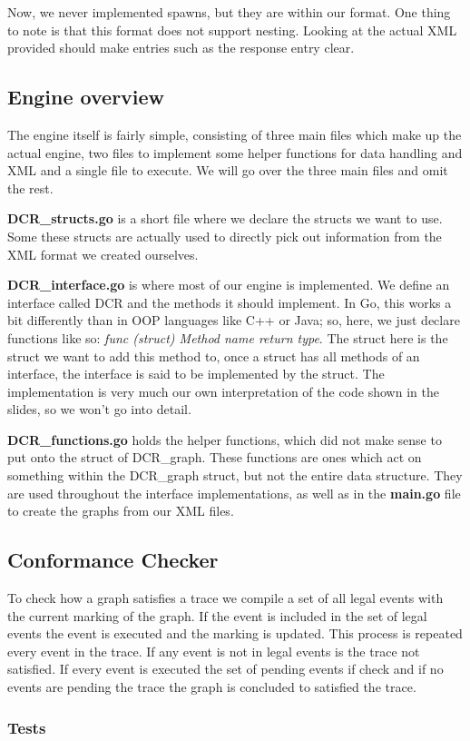 Now, we never implemented spawns, but they are within our format. One thing to note is that this
format does not support nesting. Looking at the actual XML provided should make entries such as the
response entry clear.

\subsection*{Engine overview}
The engine itself is fairly simple, consisting of three main files which make up the actual engine,
two files to implement some helper functions for data handling and XML and a single file to
execute. We will go over the three main files and omit the rest.

\textbf{DCR\_structs.go} is a short file where we declare the structs we want to use. Some these
structs are actually used to directly pick out information from the XML format we created
ourselves. 

\textbf{DCR\_interface.go} is where most of our engine is implemented. We define an interface
called DCR and the methods it should implement. In Go, this works a bit differently than in OOP
languages like C++ or Java; so, here, we just declare functions like so: \textit{func (struct)
Method name return type}. The struct here is the struct we want to add this method to, once
a struct has all methods of an interface, the interface is said to be implemented by the struct.
The implementation is very much our own interpretation of the code shown in the slides, so we won't
go into detail.

\textbf{DCR\_functions.go} holds the helper functions, which did not make sense to put onto the
struct of DCR\_graph. These functions are ones which act on something within the DCR\_graph struct,
but not the entire data structure. They are used throughout the interface implementations, as well as in the
\textbf{main.go} file to create the graphs from our XML files. 

\subsection*{Conformance Checker}
To check how a graph satisfies a trace we compile a set of all legal events
with the current marking of the graph. If the event is included in the set of legal
events the event is executed and the marking is updated. This process is repeated
every event in the trace. If any event is not in legal events is the trace not
satisfied. If every event is executed the set of pending events if check and if no
events are pending the trace the graph is concluded to satisfied the trace.

\subsubsection*{Tests}
